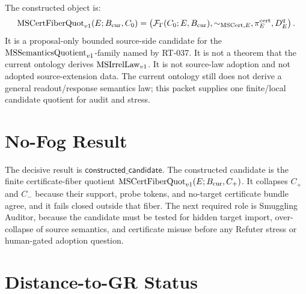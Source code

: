 The constructed object is:
\[
  \mathrm{MSCertFiberQuot}_{v1}(E;B_{\mathrm{cur}},C_0)=
  \left(\mathcal F_{\Gamma}(C_0;E,B_{\mathrm{cur}}),\sim_{\mathrm{MSCert},E},
  \pi^{\mathrm{cert}}_E,D^q_E\right).
\]
It is a proposal-only bounded source-side candidate for the
\(\mathrm{MSSemanticsQuotient}_{v1}\)-family named by RT-037.  It is not a theorem that the current
ontology derives \(\mathrm{MSIrrelLaw}_{v1}\).  It is not source-law adoption and not adopted
source-extension data.  The current ontology still does not derive a general
readout/response semantics law; this packet supplies one finite/local
candidate quotient for audit and stress.

\section{No-Fog Result}

The decisive result is \(\mathsf{constructed\_candidate}\).  The constructed
candidate is the finite certificate-fiber quotient
\(\mathrm{MSCertFiberQuot}_{v1}(E;B_{\mathrm{cur}},C_+)\).  It collapses \(C_+\) and \(C_-\) because their
support, probe tokens, and no-target certificate bundle agree, and it fails
closed outside that fiber.  The next required role is Smuggling Auditor,
because the candidate must be tested for hidden target import, over-collapse
of source semantics, and certificate misuse before any Refuter stress or
human-gated adoption question.

\section{Distance-to-GR Status}

